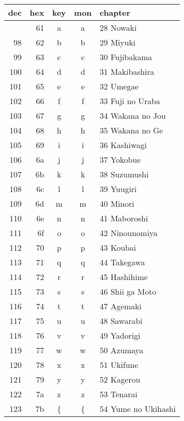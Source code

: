 \documentclass{mitsuba}
\newcommand\genji[1]{{\genjiface #1}}
\begin{document}
\begin{tabular}{rrccl}
 dec & hex & key & mon & chapter \\ \hline \bigstrut[t]
  97 & 61 & a & \genji{\large a} & 28 Nowaki \\
  98 & 62 & b & \genji{\large b} & 29 Miyuki \\
  99 & 63 & c & \genji{\large c} & 30 Fujibakama \\
  100 & 64 & d & \genji{\large d} & 31 Makibashira \\
  101 & 65 & e & \genji{\large e} & 32 Umegae \\
  102 & 66 & f & \genji{\large f} & 33 Fuji no Uraba \\
  103 & 67 & g & \genji{\large g} & 34 Wakana no Jou \\
  104 & 68 & h & \genji{\large h} & 35 Wakana no Ge \\
  105 & 69 & i & \genji{\large i} & 36 Kashiwagi \\
  106 & 6a & j & \genji{\large j} & 37 Yokobue \\
  107 & 6b & k & \genji{\large k} & 38 Suzumushi \\
  108 & 6c & l & \genji{\large l} & 39 Yuugiri \\
  109 & 6d & m & \genji{\large m} & 40 Minori \\
  110 & 6e & n & \genji{\large n} & 41 Maboroshi \\
  111 & 6f & o & \genji{\large o} & 42 Ninounomiya \\
  112 & 70 & p & \genji{\large p} & 43 Koubai \\
  113 & 71 & q & \genji{\large q} & 44 Takegawa \\
  114 & 72 & r & \genji{\large r} & 45 Hashihime \\
  115 & 73 & s & \genji{\large s} & 46 Shii ga Moto \\
  116 & 74 & t & \genji{\large t} & 47 Agemaki \\
  117 & 75 & u & \genji{\large u} & 48 Sawarabi \\
  118 & 76 & v & \genji{\large v} & 49 Yadorigi \\
  119 & 77 & w & \genji{\large w} & 50 Azumaya \\
  120 & 78 & x & \genji{\large x} & 51 Ukifune \\
  121 & 79 & y & \genji{\large y} & 52 Kagerou \\
  122 & 7a & z & \genji{\large z} & 53 Tenarai \\
  123 & 7b & \{ & \genji{\large \{} & 54 Yume no Ukihashi
\end{tabular}
\end{document}
